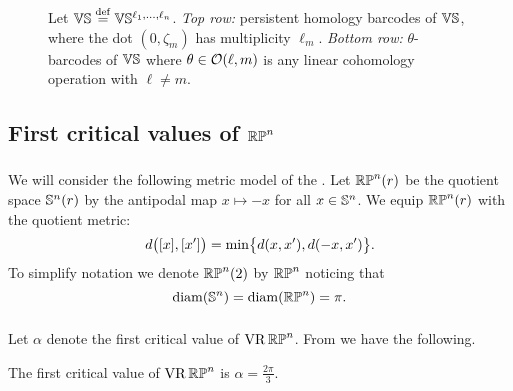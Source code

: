 \begin{figure}
	\centering
	
	\caption{Let $\VS\defeq \VS^{\ell_1,\dots,\ell_n}$.
	\emph{Top row:} persistent homology barcodes of $\VS$, where the dot $(0,\zeta_m)$ has multiplicity $\ell_m$.
	\emph{Bottom row:} $\theta$-barcodes of $\VS$ where $\theta \in \cO(\ell,m)$ is any linear cohomology operation with \(\ell \neq m\).}
	\label{fig:barcodes_vs}
\end{figure}

\subsection{First critical values of $\rp^n$}\label{sub:first_critical_value_rpn}

\subsubsection{}

We will consider the following metric model of the .
Let $\rp^n(r)$ be the quotient space $\bS^n(r)$ by the antipodal map $x \mapsto -x$ for all $x \in \bS^n$.
We equip $\rp^n(r)$ with the quotient metric:
\[
d\big([x],[x']\big) =
\min\set[\big]{d(x, x'), d(-x, x')}.
\]
To simplify notation we denote $\rp^n(2)$ by $\rp^n$ noticing that
\[
\diam(\bS^n) = \diam(\rp^n) = \pi.
\]

\subsubsection{}

Let \(\alpha\) denote the first critical value of \(\VR\rp^n\).
From \cite[Thm.~4.5]{adams2022metric} we have the following.

\medskip\proposition
The first critical value of \(\VR\rp^n\) is \(\alpha = \frac{2\pi}{3}\).
%




%

